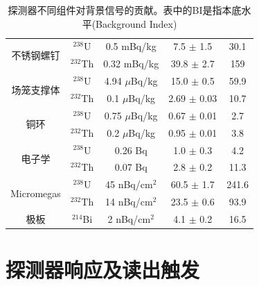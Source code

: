 \begin{table}[htb]
\begin{tabular*}{0.95\textwidth}{@{\extracolsep{\fill}}ccccc}
      \multirow{2}{4em}{不锈钢螺钉}              & $^{238}$U   &  0.5 mBq/kg & 7.5 $\pm$ 1.5 & 30.1  \\
                                            & $^{232}$Th  & 0.32 mBq/kg & 39.8 $\pm$ 2.7 & 159  \\ \hline
      \multirow{2}{4em}{场笼支撑体}    & $^{238}$U   & 4.94 $\mu$Bq/kg  & 15.0  $\pm$ 0.5  & 59.9 \\
                                            & $^{232}$Th  & 0.1 $\mu$Bq/kg & 2.69 $\pm$ 0.03 & 10.7  \\
      \multirow{2}{4em}{铜环}          & $^{238}$U  & 0.75 $\mu$Bq/kg  &  0.67 $\pm$ 0.01  & 2.7  \\
                                            & $^{232}$Th  & 0.2 $\mu$Bq/kg & 0.95 $\pm$ 0.01 &  3.8  \\ \hline
      \multirow{2}{4em}{电子学}        & $^{238}$U  & 0.26 Bq & 1.0 $\pm$ 0.3  & 4.2  \\
                                            & $^{232}$Th  & 0.07 Bq & 2.8 $\pm$ 0.2  & 11.3 \\ \hline
      \multirow{2}{4em}{Micromegas}         & $^{238}$U  & 45 nBq/cm$^2$ & 60.5 $\pm$ 1.7 &  241.6  \\
                                            & $^{232}$Th  & 14 nBq/cm$^2$ & 23.5 $\pm$ 0.6 &  93.9   \\ \hline
      \multirow{1}{4em}{极板}            & $^{214}$Bi  & 2 nBq/cm$^2$ & 4.1  $\pm$ 0.2  & 16.5 \\
      \hline
      \hline
    \end{tabular*}
    \caption{探测器不同组件对背景信号的贡献。表中的BI是指本底水平(Background Index)}
    \label{tab:rawBck}
  \end{table}
  



\section{探测器响应及读出触发}

